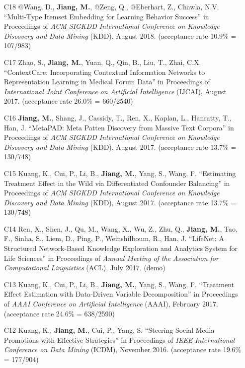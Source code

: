 \documentclass[10pt]{article}
\newenvironment{myindentpar}[1]%
{\begin{list}{}%
         {\setlength{\leftmargin}{#1}}%
         \item[]%
}
{\end{list}}
\newcounter{list}
\begin{document}
\begin{myindentpar}{0.00cm}
\begin{enumerate}[leftmargin=.5cm]
\item[C18] @Wang, D., \textbf{Jiang, M.}, @Zeng, Q., @Eberhart, Z., Chawla, N.V. ``Multi-Type Itemset Embedding for Learning Behavior Success'' in Proceedings of \textit{ACM SIGKDD International Conference on Knowledge Discovery and Data Mining} (KDD), August 2018. (acceptance rate 10.9\% = 107/983)

\item[C17] Zhao, S., \textbf{Jiang, M.}, Yuan, Q., Qin, B., Liu, T., Zhai, C.X. ``ContextCare: Incorporating Contextual Information Networks to Representation Learning in Medical Forum Data'' in Proceedings of \textit{International Joint Conference on Artificial Intelligence} (IJCAI), August 2017. (acceptance rate 26.0\% = 660/2540)

\item[C16] \textbf{Jiang, M.}, Shang, J., Cassidy, T., Ren, X., Kaplan, L., Hanratty, T., Han, J. ``MetaPAD: Meta Patten Discovery from Massive Text Corpora'' in Proceedings of \textit{ACM SIGKDD International Conference on Knowledge Discovery and Data Mining} (KDD), August 2017. (acceptance rate 13.7\% = 130/748)

\item[C15] Kuang, K., Cui, P., Li, B., \textbf{Jiang, M.}, Yang, S., Wang, F. ``Estimating Treatment Effect in the Wild via Differentiated Confounder Balancing'' in Proceedings of \textit{ACM SIGKDD International Conference on Knowledge Discovery and Data Mining} (KDD), August 2017. (acceptance rate 13.7\% = 130/748)

\item[C14] Ren, X., Shen, J., Qu, M., Wang, X., Wu, Z., Zhu, Q., \textbf{Jiang, M.}, Tao, F., Sinha, S., Liem, D., Ping, P., Weinshilboum, R., Han, J. ``LifeNet: A Structured Network-Based Knowledge Exploration and Analytics System for Life Sciences'' in Proceedings of \textit{Annual Meeting of the Association for Computational Linguistics} (ACL), July 2017. (demo)

\item[C13] Kuang, K., Cui, P., Li, B., \textbf{Jiang, M.}, Yang, S., Wang, F. ``Treatment Effect Estimation with Data-Driven Variable Decomposition'' in Proceedings of \textit{AAAI Conference on Artificial Intelligence} (AAAI), February 2017. (acceptance rate 24.6\% = 638/2590)

\item[C12] Kuang, K., \textbf{Jiang, M.}, Cui, P., Yang, S. ``Steering Social Media Promotions with Effective Strategies'' in Proceedings of \textit{IEEE International Conference on Data Mining} (ICDM), November 2016. (acceptance rate 19.6\% = 177/904)


\end{enumerate}
\end{myindentpar}
\end{document}
